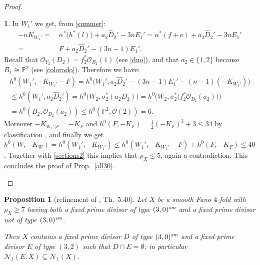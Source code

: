 \documentclass[a4paper,12pt]{amsart}
\newtheorem{proposition}[thm]{Proposition}
\theoremstyle{definition}
\newtheorem{prg}[thm]{}
\numberwithin{figure}{section}
\numberwithin{table}{section}
\newcommand{\ol}{\mathcal{O}}
\newcommand{\wi}{\widehat}
\newcommand{\pr}{\mathbb{P}}
\newcommand{\N}{\mathcal{N}_1}
\newcommand{\sm}{\text{\it sm}}
\begin{document}
\begin{proof}
\begin{prg}
In $W_1'$ we get, from \eqref{summer}: 
 \begin{align*}  -nK_{W_1'}=& \ \alpha^*\bigl(h^*(l)\bigr)+a_2\wi{D}_2'-3nE_1'=
                              \alpha^*(f+e)+a_2\wi{D}_2'-3nE_1'\\
   = & \  F+a_2\wi{D}_2'-(3n-1)E_1'.
 \end{align*}
 Recall that $\ol_{Y_2}(D_2)=f_2^*\ol_{B_2}(1)$ (see \ref{duo}), and
 that $a_2\in\{1,2\}$ because $B_1\cong\pr^2$ (see \ref{colorado}). 
  Therefore we have:
  \begin{gather*}
    h^0(W_1',-K_{W_1'}-F)= h^0\bigl(W_1',a_2\wi{D}_2'-(3n-1)E_1'-(n-1)(-K_{W_1'})\bigr)\\ \leq  h^0(W_1',a_2\wi{D}_2')
    =h^0\bigl(W_2,\sigma_2^*(a_2D_2)\bigr)
  =h^0\bigl(W_2,\sigma_2^*\bigl(f_2^*\ol_{B_2}(a_2)\bigr)\bigr)\\ =h^0(B_2,\ol_{B_2}(a_2))\leq  h^0(\pr^2,\ol(2))=6.
\end{gather*}
Moreover $-K_{W_1'|F}=-K_F$ and $h^0(F,-K_F)=\frac{1}{2}(-K_F)^3+3\leq 34$ by classification \cite[Ch.~12]{fanoEMS}, and finally we get $h^0(W,-K_W)=h^0(W_1',-K_{W_1'})\leq  h^0(W_1',-K_{W_1'}-F)+h^0(F,-K_F)\leq 40$. Together with \eqref{sections2}
this implies that $\rho_X\leq 5$, again a contradiction. This concludes the proof of Prop.~\ref{all30}.\qedhere
\end{prg}
\end{proof}
\begin{proposition}[refinement of \cite{blowup}, Th.~5.40]\label{one30}
Let $X$ be a smooth Fano $4$-fold with $\rho_X\geq 7$ having both a fixed prime divisor
of type $(3,0)^{\sm}$ and a fixed prime divisor not of type $(3,0)^{\sm}$.

Then $X$ contains a fixed prime divisor $D$
of type $(3,0)^{\sm}$ and
a fixed prime divisor $E$ of type $(3,2)$ such that $D\cap E=\emptyset$; in particular $\N(E,X)\subsetneq\N(X)$. 
\end{proposition}
\end{document}
